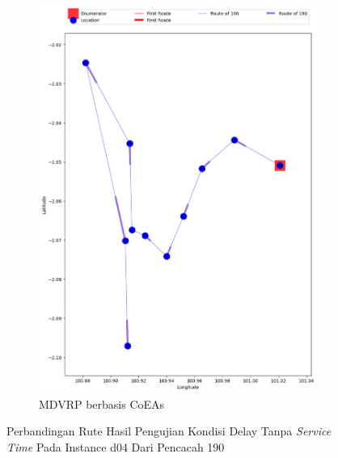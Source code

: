\begin{figure}[H]
	\centering
	\begin{subfigure}[t]{\textwidth}
		\centering
		\includegraphics[width=\textwidth]{Resources/Images/delayed_5/real_m15_n100_delayed_5_190_coes}
		\caption{MDVRP berbasis CoEAs}
		\label{fig:real_m15_n100_delayed_5_190_coes}
	\end{subfigure}
	\caption{Perbandingan Rute Hasil Pengujian Kondisi Delay Tanpa \textit{Service Time} Pada Instance d04 Dari Pencacah 190}
	\label{fig:real_m15_n100_delayed_5_190}
\end{figure}


